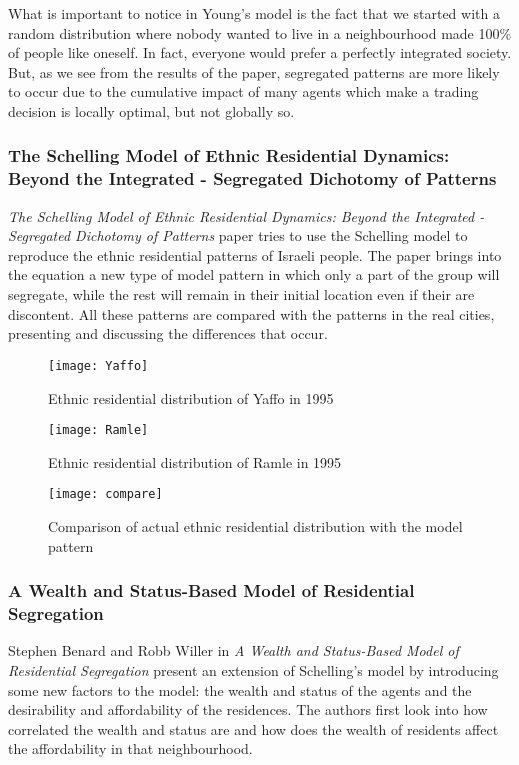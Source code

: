 \documentclass[../main.tex]{subfiles}
\begin{document}
What is important to notice in Young's model is the fact that we started with a random distribution where nobody wanted to live in a neighbourhood made 100\% of people like oneself. In fact, everyone would prefer a perfectly integrated society. But, as we see from the results of the paper, segregated patterns are more likely to occur due to the cumulative impact of many agents which make a trading decision is locally optimal, but not globally so.




\subsubsection{The Schelling Model of Ethnic Residential Dynamics: Beyond the Integrated - Segregated Dichotomy of Patterns }

\textit{The Schelling Model of Ethnic Residential Dynamics: Beyond the Integrated - Segregated Dichotomy of Patterns} paper \cite[]{ethnic} tries to use the Schelling model to reproduce the ethnic residential patterns of Israeli people. The paper brings into the equation a new type of model pattern in which only a part of the group will segregate, while the rest will remain in their initial location even if their are discontent. All these patterns are compared with the patterns in the real cities, presenting and discussing the differences that occur. 

\begin{figure}[H]
\centering
\texttt{[image: Yaffo]}
\caption{Ethnic residential distribution of Yaffo in 1995}
\end{figure}

\begin{figure}[H]
\centering
\texttt{[image: Ramle]}
\caption{Ethnic residential distribution of Ramle in 1995}
\end{figure}

\begin{figure}[H]
\centering
\texttt{[image: compare]}
\caption{Comparison of actual ethnic residential distribution with the model pattern}
\end{figure}

\subsubsection{A Wealth and Status-Based Model of Residential Segregation}
 Stephen Benard and Robb Willer in \textit{A Wealth and Status-Based Model of Residential Segregation}\cite[]{AWealthandStatus-BasedModelofResidentialSegregation} present an extension of Schelling's model by introducing some new factors to the model: the wealth and status of the agents and the desirability and affordability of the residences. The authors first look into how correlated the wealth and status are and how does the wealth of residents affect the affordability in that neighbourhood. 
 
\end{document}
